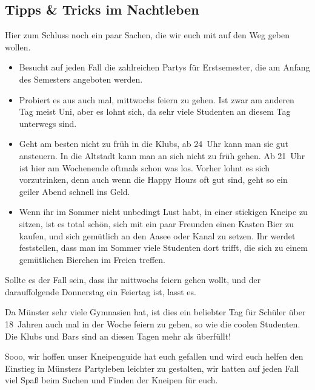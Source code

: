 {\begin{multicols*}{2}
\begin{center}
\end{center}

\setcounter{secnumdepth}{\value{fibtemp}}
\subsection{Tipps \& Tricks im Nachtleben}
Hier zum Schluss noch ein paar Sachen, die wir euch mit auf den Weg geben wollen.
\begin{itemize}[labelsep=*, leftmargin=1.2em]
	\item Besucht auf jeden Fall die zahlreichen Partys für Erstsemester, die am Anfang des Semesters angeboten werden.
	\item Probiert es aus auch mal, mittwochs feiern zu gehen.
	Ist zwar am anderen Tag meist Uni, aber es lohnt sich, da sehr viele Studenten an diesem Tag unterwegs sind.
	\item Geht am besten nicht zu früh in die Klubs, ab 24~Uhr kann man sie gut ansteuern.
	In die Altstadt kann man an sich nicht zu früh gehen.
	Ab 21~Uhr ist hier am Wochenende oftmals schon was los.
	Vorher lohnt es sich vorzutrinken, denn auch wenn die Happy Hours oft gut sind, geht so ein geiler Abend schnell ins Geld.
	\item Wenn ihr im Sommer nicht unbedingt Lust habt, in einer stickigen Kneipe zu sitzen, ist es total schön, sich mit ein paar Freunden einen Kasten Bier zu kaufen, und sich gemütlich an den Aasee oder Kanal zu setzen.
	Ihr werdet feststellen, dass man im Sommer viele Studenten dort trifft, die sich zu einem gemütlichen Bierchen im Freien treffen.
\end{itemize}

Sollte es der Fall sein, dass ihr mittwochs feiern gehen wollt, und der darauffolgende Donnerstag ein Feiertag ist, lasst es.

Da Münster sehr viele Gymnasien hat, ist dies ein beliebter Tag für Schüler über 18~Jahren auch mal in der Woche feiern zu gehen, so wie die coolen Studenten.
Die Klubs und Bars sind an diesen Tagen mehr als überfüllt!

Sooo, wir hoffen unser Kneipenguide hat euch gefallen und wird euch helfen den Einstieg in Münsters Partyleben leichter zu gestalten, wir hatten auf jeden Fall viel Spaß beim Suchen und Finden der Kneipen für euch.


\end{multicols*}

}
